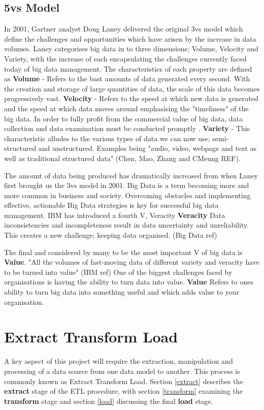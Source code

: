\subsection{5vs Model}
In 2001, Gartner analyst Doug Laney delivered the original 3vs model which define the challenges and opportunities which have arisen by the increase in data volumes. Laney categorises big data in to three dimensions; Volume, Velocity and Variety, with the increase of each encapsulating the challenges currently faced today of big data management. The characteristics of each property are defined as \textbf{Volume} - Refers to the bast amounts of data generated every second. With the creation and storage of large quantities of data, the scale of this data becomes progressively vast. \textbf{Velocity} - Refers to the speed at which new data is generated and the speed at which data moves around emphasising the "timeliness" of the big data. In order to fully profit from the commercial value of big data, data collection and data examination must be conducted promptly . \textbf{Variety} - This characteristic alludes to the various types of data we can now use; semi-structured and unstructured. Examples being "audio, video, webpage and text as well as traditional structured data" (Chen, Mao, Zhang and CMeung REF).

The amount of data being produced has dramatically increased from when Laney first brought us the 3vs model in 2001. Big Data is a term becoming more and more common in business and society. Overcoming obstacles and implementing effective, actionable Big Data strategies is key for successful big data management. IBM has introduced a fourth V, Veracity \textbf{Veracity} Data inconsistencies and incompleteness result in data uncertainty and unreliability. This creates a new challenge; keeping data organised. (Big Data ref)

The final and considered by many to be the most important V of big data is \textbf{Value}. "All the volumes of fast-moving data of different variety and veracity have to be turned into value" (IBM ref) One of the biggest challenges faced by organisations is having the ability to turn data into value. \textbf{Value} Refers to ones ability to turn big data into something useful and which adds value to your organisation.

\section{Extract Transform Load}\label{etl}
A key aspect of this project will require the extraction, manipulation and processing of a data source from one data model to another. This process is commonly known as Extract Transform Load. Section \ref{extract} describes the \textbf{extract} stage of the ETL procedure, with section \ref{transform} examining the \textbf{transform} stage and section \ref{load} discussing the final \textbf{load} stage.

